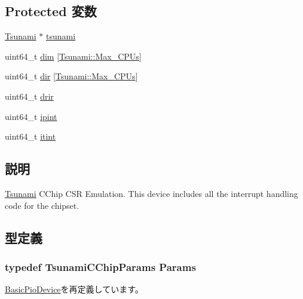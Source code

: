 \subsection*{Protected 変数}
\begin{DoxyCompactItemize}
\item 
\hyperlink{classTsunami}{Tsunami} $\ast$ \hyperlink{classTsunamiCChip_aa178467f241f875a068722413f62ec20}{tsunami}
\item 
uint64\_\-t \hyperlink{classTsunamiCChip_ad791aec1b6c30bc2e0d2a6e2016ea3ba}{dim} \mbox{[}\hyperlink{classTsunami_ab15ce4af0fe2c47746a30bafa34ced51}{Tsunami::Max\_\-CPUs}\mbox{]}
\item 
uint64\_\-t \hyperlink{classTsunamiCChip_a41f0c570ffaf676a652c72cca47f743a}{dir} \mbox{[}\hyperlink{classTsunami_ab15ce4af0fe2c47746a30bafa34ced51}{Tsunami::Max\_\-CPUs}\mbox{]}
\item 
uint64\_\-t \hyperlink{classTsunamiCChip_aa506ee56b76eeb7c0ffa0112c07799e7}{drir}
\item 
uint64\_\-t \hyperlink{classTsunamiCChip_aa814845b1fc114b393e125f86d7dc57e}{ipint}
\item 
uint64\_\-t \hyperlink{classTsunamiCChip_ad115b62dbebcd51ee67d3110a1b143c6}{itint}
\end{DoxyCompactItemize}


\subsection{説明}
\hyperlink{classTsunami}{Tsunami} CChip CSR Emulation. This device includes all the interrupt handling code for the chipset. 

\subsection{型定義}
\hypertarget{classTsunamiCChip_ae88d115af4688355c68945ae8486b7ec}{
\subsubsection[{Params}]{\setlength{\rightskip}{0pt plus 5cm}typedef TsunamiCChipParams {\bf Params}}}
\label{classTsunamiCChip_ae88d115af4688355c68945ae8486b7ec}


\hyperlink{classBasicPioDevice_a2845515ac6467f10540747053c8a0449}{BasicPioDevice}を再定義しています。

